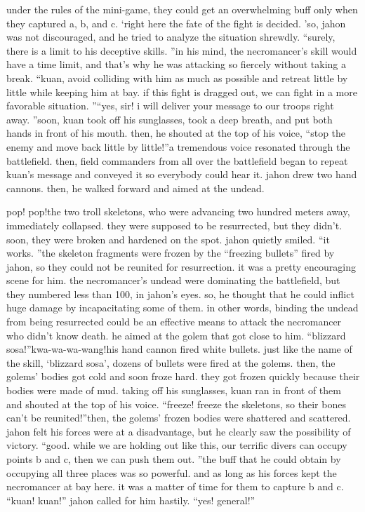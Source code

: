 under the rules of the mini-game, they could get an overwhelming buff only when they captured a, b, and c.
‘right here the fate of the fight is decided.
’so, jahon was not discouraged, and he tried to analyze the situation shrewdly.
“surely, there is a limit to his deceptive skills.
”in his mind, the necromancer’s skill would have a time limit, and that’s why he was attacking so fiercely without taking a break.
“kuan, avoid colliding with him as much as possible and retreat little by little while keeping him at bay.
 if this fight is dragged out, we can fight in a more favorable situation.
”“yes, sir! i will deliver your message to our troops right away.
”soon, kuan took off his sunglasses, took a deep breath, and put both hands in front of his mouth.
 then, he shouted at the top of his voice, “stop the enemy and move back little by little!”a tremendous voice resonated through the battlefield.
 then, field commanders from all over the battlefield began to repeat kuan’s message and conveyed it so everybody could hear it.
jahon drew two hand cannons.
 then, he walked forward and aimed at the undead.


pop! pop!the two troll skeletons, who were advancing two hundred meters away, immediately collapsed.
they were supposed to be resurrected, but they didn’t.
 soon, they were broken and hardened on the spot.
jahon quietly smiled.
 “it works.
”the skeleton fragments were frozen by the “freezing bullets” fired by jahon, so they could not be reunited for resurrection.
 it was a pretty encouraging scene for him.
the necromancer’s undead were dominating the battlefield, but they numbered less than 100, in jahon’s eyes.
 so, he thought that he could inflict huge damage by incapacitating some of them.
 in other words, binding the undead from being resurrected could be an effective means to attack the necromancer who didn’t know death.
he aimed at the golem that got close to him.
“blizzard sosa!”kwa-wa-wa-wang!his hand cannon fired white bullets.
 just like the name of the skill, ‘blizzard sosa’, dozens of bullets were fired at the golems.
then, the golems’ bodies got cold and soon froze hard.
 they got frozen quickly because their bodies were made of mud.
taking off his sunglasses, kuan ran in front of them and shouted at the top of his voice.
“freeze! freeze the skeletons, so their bones can’t be reunited!”then, the golems’ frozen bodies were shattered and scattered.
jahon felt his forces were at a disadvantage, but he clearly saw the possibility of victory.
“good.
 while we are holding out like this, our terrific divers can occupy points b and c, then we can push them out.
”the buff that he could obtain by occupying all three places was so powerful.
 and as long as his forces kept the necromancer at bay here.
 it was a matter of time for them to capture b and c.
“kuan! kuan!” jahon called for him hastily.
“yes! general!”

 
